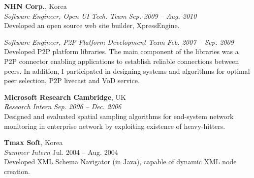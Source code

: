 \documentclass[margin,line]{res}
\begin{document}
\begin{resume}
{\bf NHN Corp.}, Korea \\
{\em Software Engineer, Open UI Tech. Team} \hfill {\it Sep. 2009 -- Aug. 2010}\\
Developed an open source web site builder, XpressEngine.

{\em Software Engineer, P2P Platform Development Team} \hfill {\it Feb. 2007 -- Sep. 2009}\\
Developed P2P platform libraries. %
The main component of the libraries was a P2P connector enabling applications to establish reliable connections between peers. 
In addition, I participated in designing systems and algorithms for optimal peer
selection, P2P livecast and VoD service.

{\bf Microsoft Research Cambridge}, UK \\
{\em Research Intern} \hfill {\it Sep. 2006 -- Dec. 2006} \\
Designed and evaluated spatial sampling algorithms for end-system network monitoring in enterprise network by exploiting existence of heavy-hitters. 



{\bf Tmax Soft}, Korea\\
{\em Summer Intern} \hfill {\sc Jul. 2004 -- Aug. 2004}\\
Developed XML Schema Navigator (in Java), capable of dynamic XML node creation.\\



\end{resume}
\end{document}
